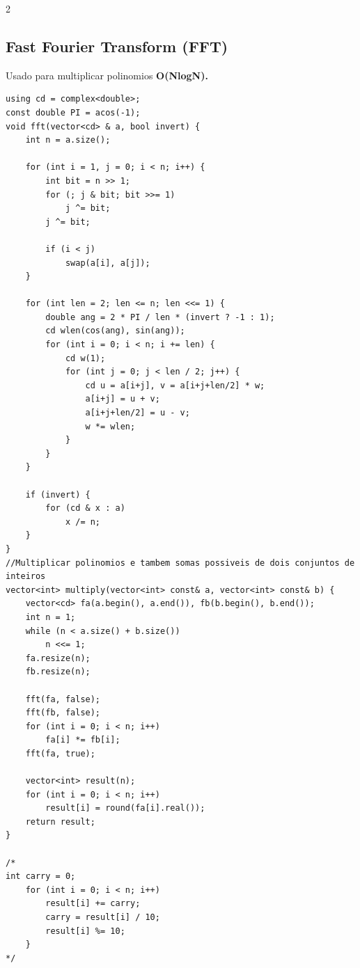 \documentclass[11pt]{article}
\begin{document}
\begin{multicols}{2}
\subsection{Fast Fourier Transform (FFT)}
Usado para multiplicar polinomios \textbf{O(NlogN).}
\begin{lstlisting}
using cd = complex<double>;
const double PI = acos(-1);
void fft(vector<cd> & a, bool invert) {
    int n = a.size();

    for (int i = 1, j = 0; i < n; i++) {
        int bit = n >> 1;
        for (; j & bit; bit >>= 1)
            j ^= bit;
        j ^= bit;

        if (i < j)
            swap(a[i], a[j]);
    }

    for (int len = 2; len <= n; len <<= 1) {
        double ang = 2 * PI / len * (invert ? -1 : 1);
        cd wlen(cos(ang), sin(ang));
        for (int i = 0; i < n; i += len) {
            cd w(1);
            for (int j = 0; j < len / 2; j++) {
                cd u = a[i+j], v = a[i+j+len/2] * w;
                a[i+j] = u + v;
                a[i+j+len/2] = u - v;
                w *= wlen;
            }
        }
    }

    if (invert) {
        for (cd & x : a)
            x /= n;
    }
}
//Multiplicar polinomios e tambem somas possiveis de dois conjuntos de inteiros
vector<int> multiply(vector<int> const& a, vector<int> const& b) {
    vector<cd> fa(a.begin(), a.end()), fb(b.begin(), b.end());
    int n = 1;
    while (n < a.size() + b.size()) 
        n <<= 1;
    fa.resize(n);
    fb.resize(n);

    fft(fa, false);
    fft(fb, false);
    for (int i = 0; i < n; i++)
        fa[i] *= fb[i];
    fft(fa, true);

    vector<int> result(n);
    for (int i = 0; i < n; i++)
        result[i] = round(fa[i].real());
    return result;
}

/*
int carry = 0;
    for (int i = 0; i < n; i++)
        result[i] += carry;
        carry = result[i] / 10;
        result[i] %= 10;
    }
*/
\end{lstlisting}


\end{multicols}
\end{document}
